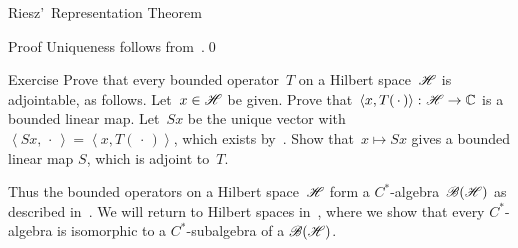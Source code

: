 \documentclass[a]{subfiles}
\begin{document}
\begin{parsec}
\begin{point}{Riesz'~Representation Theorem}
\begin{point}{Proof}
Uniqueness follows from~.\qed
\end{point}
\end{point}
\begin{point}{Exercise}%
Prove that every bounded operator~$T$ on a Hilbert space~$\mathscr{H}$
is adjointable, as follows.
Let~$x\in \mathscr{H}$ be given.
Prove that~$\left<x,T(\,\cdot\,)\right>\colon \mathscr{H}\to \mathbb{C}$
is a bounded linear map.
Let~$Sx$ be the unique vector with $\left<Sx,\,\cdot\,\right>
=\left<x,T(\,\cdot\,)\right>$,
which exists by~.
Show that~$x\mapsto Sx$
gives a bounded linear map $S$, which is adjoint to~$T$.
\end{point}
\begin{point}%
Thus the bounded operators
on a Hilbert space~$\mathscr{H}$
form a $C^*$-algebra~$\mathscr{B}(\mathscr{H})$
as described in~.
We will return to Hilbert spaces
in~,
where we show that every $C^*$-algebra
is isomorphic to a $C^*$-subalgebra of
a $\mathscr{B}(\mathscr{H})$.
\end{point}
\end{parsec}
\end{document}
